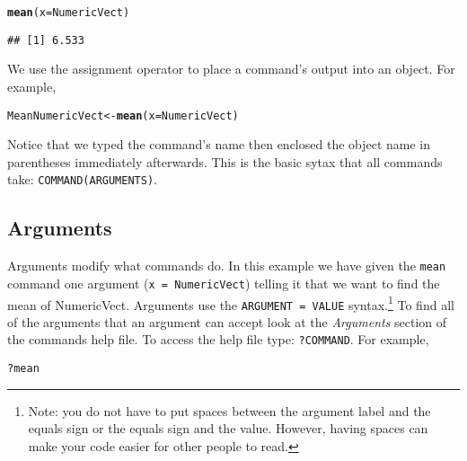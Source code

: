 \documentclass[ChapterTOCs,krantz1]{krantz}\usepackage{graphicx, color}
\makeatletter
\newcommand{\hlfunctioncall}[1]{\textcolor[rgb]{0.501960784313725,0,0.329411764705882}{\textbf{#1}}}%
\newenvironment{kframe}{%
 \def\at@end@of@kframe{}%
 \ifinner\ifhmode%
  \def\at@end@of@kframe{\end{minipage}}%
  \begin{minipage}{\columnwidth}%
 \fi\fi%
 \def\FrameCommand##1{\hskip\@totalleftmargin \hskip-\fboxsep
 \colorbox{shadecolor}{##1}\hskip-\fboxsep
     \hskip-\linewidth \hskip-\@totalleftmargin \hskip\columnwidth}%
 \MakeFramed {\advance\hsize-\width
   \@totalleftmargin\z@ \linewidth\hsize
   \@setminipage}}%
 {\par\unskip\endMakeFramed%
 \at@end@of@kframe}
\newenvironment{knitrout}{}{} %
\makeatother
\begin{document}
\begin{knitrout}
\color{fgcolor}\begin{kframe}
\begin{alltt}
\hlfunctioncall{mean}(x = NumericVect)
\end{alltt}
\begin{verbatim}
## [1] 6.533
\end{verbatim}
\end{kframe}
\end{knitrout}


\noindent We use the assignment operator to place a command's output into an object. For example,

\begin{knitrout}
\color{fgcolor}\begin{kframe}
\begin{alltt}
MeanNumericVect <- \hlfunctioncall{mean}(x = NumericVect)
\end{alltt}
\end{kframe}
\end{knitrout}


\noindent Notice that we typed the command's name then enclosed the object name in parentheses immediately afterwards. This is the basic sytax that all commands take: \texttt{COMMAND(ARGUMENTS)}. 

\subsection{Arguments}

Arguments modify what commands do. In this example we have given the \texttt{mean} command one argument (\texttt{x = NumericVect}) telling it that we want to find the mean of NumericVect. Arguments use the \texttt{ARGUMENT = VALUE} syntax.\footnote{Note: you do not have to put spaces between the argument label and the equals sign or the equals sign and the value. However, having spaces can make your code easier for other people to read.} To find all of the arguments that an argument can accept look at the {\emph{Arguments}} section of the commands help file. To access the help file type: \texttt{?COMMAND}. For example,

\begin{knitrout}
\color{fgcolor}\begin{kframe}
\begin{alltt}
?mean
\end{alltt}
\end{kframe}
\end{knitrout}
\end{document}
